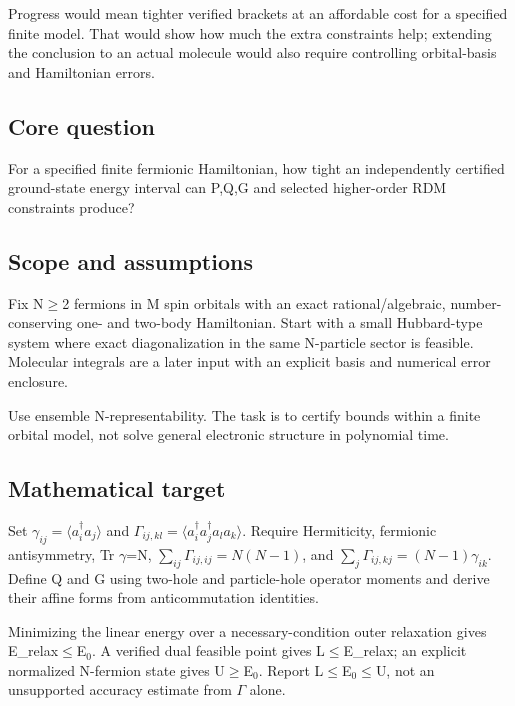 \documentclass[
  11pt,
]{article}
\begin{document}
Progress would mean tighter verified brackets at an affordable cost for
a specified finite model. That would show how much the extra constraints
help; extending the conclusion to an actual molecule would also require
controlling orbital-basis and Hamiltonian errors.

\subsection{Core question}

For a specified finite fermionic Hamiltonian, how tight an independently
certified ground-state energy interval can P,Q,G and selected
higher-order RDM constraints produce?

\subsection{Scope and assumptions}

Fix N\ensuremath{\ge}2 fermions in M spin orbitals with an exact
rational/algebraic, number-conserving one- and two-body Hamiltonian.
Start with a small Hubbard-type system where exact diagonalization in
the same N-particle sector is feasible. Molecular integrals are a later
input with an explicit basis and numerical error enclosure.

Use ensemble N-representability. The task is to certify bounds within a
finite orbital model, not solve general electronic structure in
polynomial time.

\subsection{Mathematical target}

Set \(\gamma_{ij}=\langle a_i^\dagger a_j\rangle\) and
\(\Gamma_{ij,kl}=\langle a_i^\dagger a_j^\dagger a_l a_k\rangle\).
Require Hermiticity, fermionic antisymmetry, Tr \ensuremath{\gamma}=N,
\(\sum_{ij}\Gamma_{ij,ij}=N(N-1)\), and
\(\sum_j\Gamma_{ij,kj}=(N-1)\gamma_{ik}\). Define Q and G using two-hole
and particle-hole operator moments and derive their affine forms from
anticommutation identities.

Minimizing the linear energy over a necessary-condition outer relaxation
gives E\_relax\ensuremath{\le}E\ensuremath{{}_{0}}. A verified dual
feasible point gives L\ensuremath{\le}E\_relax; an explicit normalized
N-fermion state gives U\ensuremath{\ge}E\ensuremath{{}_{0}}. Report
L\ensuremath{\le}E\ensuremath{{}_{0}}\ensuremath{\le}U, not an
unsupported accuracy estimate from \ensuremath{\Gamma} alone.
\end{document}
